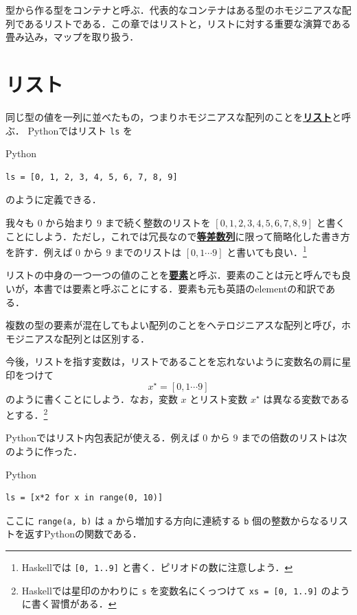\documentclass[a4paper,twocolumn]{jsbook}
\newcommand{\programminglanguage}[1]{\textsf{#1}}
\newcommand{\haskell}{\programminglanguage{Haskell}}
\newcommand{\python}{\programminglanguage{Python}}
\newenvironment{leader}{\begingroup\gt}{\endgroup}
\newcommand{\keyword}[1]{{\underline{\textbf{#1}}}}
\newcommand{\code}[1]{\texttt{#1}}
\newenvironment{pythoncode}{\begin{itembox}[r]{\python}}{\end{itembox}}
\newcommand{\mListWith}[1]{\left[#1\right]}
\newcommand{\mList}[1]{{#1}^\mathrm{\star}}
\begin{document}
\begin{leader}
型から作る型をコンテナと呼ぶ．代表的なコンテナはある型のホモジニアスな配列であるリストである．この章ではリストと，リストに対する重要な演算である畳み込み，マップを取り扱う．
\end{leader}


\section{リスト}

同じ型の値を一列に並べたもの，つまりホモジニアスな配列のことを\keyword{リスト}と呼ぶ．
\python ではリスト \code{ls} を
\begin{pythoncode}
\begin{verbatim}
ls = [0, 1, 2, 3, 4, 5, 6, 7, 8, 9]
\end{verbatim}
\end{pythoncode}
のように定義できる．

我々も $0$ から始まり $9$ まで続く整数のリストを $\mListWith{0,1,2,3,4,5,6,7,8,9}$ と書くことにしよう．ただし，これでは冗長なので\keyword{等差数列}に限って簡略化した書き方を許す．例えば $0$ から $9$ までのリストは $\mListWith{0,1\dotsb9}$ と書いても良い．\footnote{\haskell では \code{[0, 1..9]} と書く．ピリオドの数に注意しよう．}

リストの中身の一つ一つの値のことを\keyword{要素}と呼ぶ．要素のことは元と呼んでも良いが，本書では要素と呼ぶことにする．要素も元も英語のelementの和訳である．

複数の型の要素が混在してもよい配列のことをヘテロジニアスな配列と呼び，ホモジニアスな配列とは区別する．

今後，リストを指す変数は，リストであることを忘れないように変数名の肩に星印をつけて
\begin{equation}
\mList{x}=\mListWith{0,1\dotsb9}
\end{equation}
のように書くことにしよう．なお，変数 $x$ とリスト変数 $\mList{x}$ は異なる変数であるとする．\footnote{\haskell では星印のかわりに \code{s} を変数名にくっつけて \code{xs = [0, 1..9]} のように書く習慣がある．}

\python ではリスト内包表記が使える．例えば $0$ から $9$ までの倍数のリストは次のように作った．
\begin{pythoncode}
\begin{verbatim}
ls = [x*2 for x in range(0, 10)]
\end{verbatim}
\end{pythoncode}
ここに \code{range(a, b)} は \code{a} から増加する方向に連続する \code{b} 個の整数からなるリストを返す\python の関数である．
\end{document}
